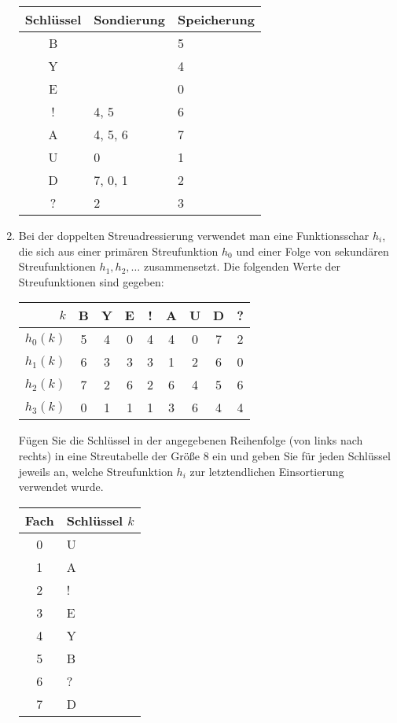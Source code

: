 \documentclass{lehramt-informatik-aufgabe}
\begin{document}
\begin{enumerate}
\begin{liAntwort}
\begin{center}
\begin{tabular}{|c||l|l|}
\hline
Schlüssel & Sondierung & Speicherung\\
\hline
B & & 5 \\
Y & & 4 \\
E & & 0 \\
! & 4, 5 & 6 \\
A & 4, 5, 6 & 7 \\
U & 0 & 1 \\
D & 7, 0, 1 & 2 \\
? & 2 & 3 \\
\hline
\end{tabular}
\end{center}
\end{liAntwort}


\item Bei der doppelten Streuadressierung verwendet man eine
Funktionsschar $h_i$, die sich aus einer primären Streufunktion $h_0$
und einer Folge von sekundären Streufunktionen $h_1, h_2,\dots$
zusammensetzt. Die folgenden Werte der Streufunktionen sind gegeben:

\begin{center}
\begin{tabular}{|r||c|c|c|c|c|c|c|c|}
\hline
$k$      & B & Y & E & ! & A & U & D & ? \\\hline
$h_0(k)$ & 5 & 4 & 0 & 4 & 4 & 0 & 7 & 2 \\\hline
$h_1(k)$ & 6 & 3 & 3 & 3 & 1 & 2 & 6 & 0 \\\hline
$h_2(k)$ & 7 & 2 & 6 & 2 & 6 & 4 & 5 & 6 \\\hline
$h_3(k)$ & 0 & 1 & 1 & 1 & 3 & 6 & 4 & 4 \\\hline
\end{tabular}
\end{center}

Fügen Sie die Schlüssel in der angegebenen Reihenfolge (von links nach
rechts) in eine Streutabelle der Größe $8$ ein und geben Sie für jeden
Schlüssel jeweils an, welche Streufunktion $h_i$ zur letztendlichen
Einsortierung verwendet wurde.

\begin{liAntwort}
\begin{center}
\begin{tabular}{|c||l|}
\hline
Fach & Schlüssel $k$\\
\hline
0 & U \\
1 & A \\
2 & ! \\
3 & E \\
4 & Y \\
5 & B \\
6 & ? \\
7 & D \\
\hline
\end{tabular}
\end{center}


\end{liAntwort}
\end{enumerate}
\end{document}
